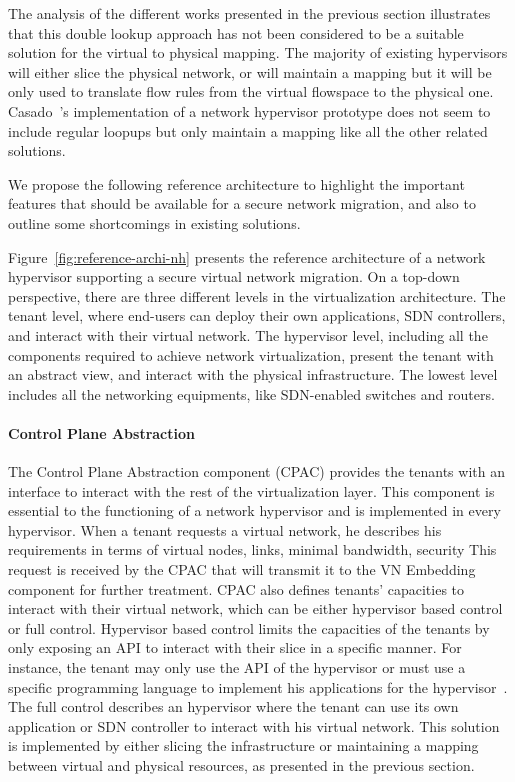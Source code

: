 The analysis of the different works presented in the previous section illustrates that this double lookup approach has not been considered to be a suitable solution for the virtual to physical mapping. The majority of existing hypervisors will either slice the physical network, or will maintain a mapping but it will be only used to translate flow rules from the virtual flowspace to the physical one. Casado~\etal's  implementation of a network hypervisor prototype does not seem to include regular loopups but only maintain a mapping like all the other related solutions.

We propose the following reference architecture to highlight the important features that should be available for a secure network migration, and also to outline some shortcomings in existing solutions.


  
Figure~\ref{fig:reference-archi-nh} presents the reference architecture of a network hypervisor supporting a secure virtual network migration.
On a top-down perspective, there are three different levels in the virtualization architecture.
The tenant level, where end-users can deploy their own applications, SDN controllers, and interact with their virtual network.
The hypervisor level, including all the components required to achieve network virtualization, present the tenant with an abstract view, and interact with the physical infrastructure.
The lowest level includes all the networking equipments, like SDN-enabled switches and routers.

\paragraph{Control Plane Abstraction}
The Control Plane Abstraction component (CPAC) provides the tenants with an interface to interact with the rest of the virtualization layer.
This component is essential to the functioning of a network hypervisor and is implemented in every hypervisor.
When a tenant requests a virtual network, he describes his requirements in terms of virtual nodes, links, minimal bandwidth, security \etc This request is received by the CPAC that will transmit it to the VN Embedding component for further treatment.
CPAC also defines tenants' capacities to interact with their virtual network, which can be either hypervisor based control or full control.
Hypervisor based control limits the capacities of the tenants by only exposing an API to interact with their slice in a specific manner. For instance, the tenant may only use the API of the hypervisor or must use a specific programming language to implement his applications for the hypervisor~\cite{CompositionalHypervisor-Jin2014,NetworkHypervisor-Huang2013}. 
The full control describes an hypervisor where the tenant can use its own application or SDN controller to interact with his virtual network. This solution is implemented by either slicing the infrastructure or maintaining a mapping between virtual and physical resources, as presented in the previous section.



